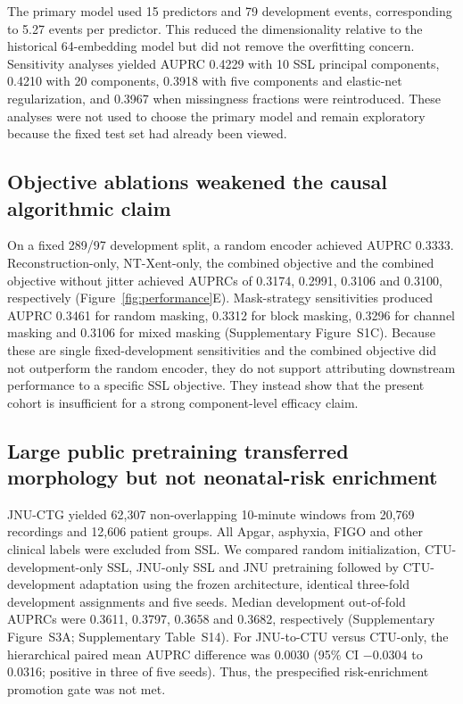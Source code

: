 \documentclass[utf8]{FrontiersinHarvard}
\begin{document}
The primary model used 15 predictors and 79 development events, corresponding to 5.27 events per predictor. This reduced the dimensionality relative to the historical 64-embedding model but did not remove the overfitting concern. Sensitivity analyses yielded AUPRC 0.4229 with 10 SSL principal components, 0.4210 with 20 components, 0.3918 with five components and elastic-net regularization, and 0.3967 when missingness fractions were reintroduced. These analyses were not used to choose the primary model and remain exploratory because the fixed test set had already been viewed.

\subsection{Objective ablations weakened the causal algorithmic claim}

On a fixed 289/97 development split, a random encoder achieved AUPRC 0.3333. Reconstruction-only, NT-Xent-only, the combined objective and the combined objective without jitter achieved AUPRCs of 0.3174, 0.2991, 0.3106 and 0.3100, respectively (Figure~\ref{fig:performance}E). Mask-strategy sensitivities produced AUPRC 0.3461 for random masking, 0.3312 for block masking, 0.3296 for channel masking and 0.3106 for mixed masking (Supplementary Figure~S1C). Because these are single fixed-development sensitivities and the combined objective did not outperform the random encoder, they do not support attributing downstream performance to a specific SSL objective. They instead show that the present cohort is insufficient for a strong component-level efficacy claim.

\subsection{Large public pretraining transferred morphology but not neonatal-risk enrichment}

JNU-CTG yielded 62,307 non-overlapping 10-minute windows from 20,769 recordings and 12,606 patient groups. All Apgar, asphyxia, FIGO and other clinical labels were excluded from SSL. We compared random initialization, CTU-development-only SSL, JNU-only SSL and JNU pretraining followed by CTU-development adaptation using the frozen architecture, identical three-fold development assignments and five seeds. Median development out-of-fold AUPRCs were 0.3611, 0.3797, 0.3658 and 0.3682, respectively (Supplementary Figure~S3A; Supplementary Table~S14). For JNU-to-CTU versus CTU-only, the hierarchical paired mean AUPRC difference was 0.0030 (95\% CI $-0.0304$ to 0.0316; positive in three of five seeds). Thus, the prespecified risk-enrichment promotion gate was not met.
\end{document}
